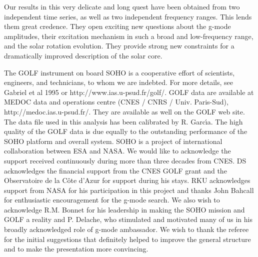 \documentclass[bibyear]{aa}
\begin{document}
Our results in this very delicate and long quest have been obtained from two independent time series, as well as two independent frequency ranges. This lends them great credence. They open exciting new questions about the g-mode amplitudes, their excitation mechanism in such a broad and low-frequency range, and the solar rotation evolution. They provide strong new constraints for a dramatically improved description of the solar core.


\begin{acknowledgements}

The GOLF instrument on board SOHO is a cooperative effort of scientists, engineers, and technicians, to whom we are indebted.  For more details, see Gabriel et al 1995  or http://www.ias.u-psud.fr/golf/. GOLF data are available at MEDOC data and operations centre (CNES / CNRS / Univ. Paris-Sud), http://medoc.ias.u-psud.fr/. They are available as well on the GOLF web site. The data file used in this analysis has been calibrated  by R. Garc{\'{\i}}a. The high quality of the GOLF data is due equally to the outstanding performance of the SOHO platform and overall system. SOHO is a project of international collaboration between ESA and NASA. We would like to acknowledge the support received continuously during more than three decades from CNES. DS acknowledges the financial support from the CNES GOLF grant and the Observatoire de la C\^ote d'Azur for support during his stays. RKU acknowledges support from NASA for his participation in this
project and thanks John Bahcall for enthusiastic encouragement for
the g-mode search. We also wish to acknowledge R.M. Bonnet for his leadership in making the SOHO mission and GOLF a reality and P. Delache, who stimulated and motivated many of us in his broadly acknowledged role of g-mode ambassador. We wish to thank the referee for the initial suggestions that definitely helped to improve the general structure and to make the presentation more convincing.
\end{acknowledgements}

\end{document}
